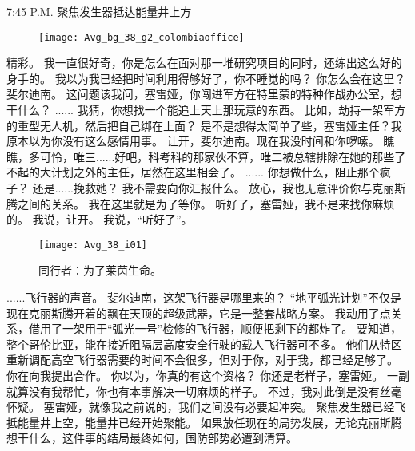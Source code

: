 \documentclass[openany]{book}
\begin{document}
7:45 P.M. 聚焦发生器抵达能量井上方
\begin{figure}[h]
    \centering
    \texttt{[image: Avg\_bg\_38\_g2\_colombiaoffice]}
\end{figure}
\begin{dialogue}
     精彩。
     我一直很好奇，你是怎么在面对那一堆研究项目的同时，还练出这么好的身手的。
     我以为我已经把时间利用得够好了，你不睡觉的吗？
     你怎么会在这里？
     斐尔迪南。
     这问题该我问，塞雷娅，你闯进军方在特里蒙的特种作战办公室，想干什么？
     ......
     我猜，你想找一个能追上天上那玩意的东西。
     比如，劫持一架军方的重型无人机，然后把自己绑在上面？
     是不是想得太简单了些，塞雷娅主任？我原本以为你没有这么感情用事。
     让开，斐尔迪南。现在我没时间和你啰嗦。
     瞧瞧，多可怜，唯三......好吧，科考科的那家伙不算，唯二被总辖排除在她的那些了不起的大计划之外的主任，居然在这里相会了。
     ......
     你想做什么，阻止那个疯子？
     还是......挽救她？
     我不需要向你汇报什么。
     放心，我也无意评价你与克丽斯腾之间的关系。
     我在这里就是为了等你。
     听好了，塞雷娅，我不是来找你麻烦的。
     我说，让开。
     我说，“听好了”。
    \begin{figure}[h]
        \caption*{同行者：为了莱茵生命。}
        \centering
        \texttt{[image: Avg\_38\_i01]}
    \end{figure}
     ......飞行器的声音。
     斐尔迪南，这架飞行器是哪里来的？
     “地平弧光计划”不仅是现在克丽斯腾开着的飘在天顶的超级武器，它是一整套战略方案。
     我动用了点关系，借用了一架用于“弧光一号”检修的飞行器，顺便把剩下的都炸了。
     要知道，整个哥伦比亚，能在接近阻隔层高度安全行驶的载人飞行器可不多。
     他们从特区重新调配高空飞行器需要的时间不会很多，但对于你，对于我，都已经足够了。
     你在向我提出合作。
     你以为，你真的有这个资格？
     你还是老样子，塞雷娅。
     一副就算没有我帮忙，你也有本事解决一切麻烦的样子。
     不过，我对此倒是没有丝毫怀疑。
     塞雷娅，就像我之前说的，我们之间没有必要起冲突。
     聚焦发生器已经飞抵能量井上空，能量井已经开始聚能。
     如果放任现在的局势发展，无论克丽斯腾想干什么，这件事的结局最终如何，国防部势必遭到清算。

\end{dialogue}
\end{document}
